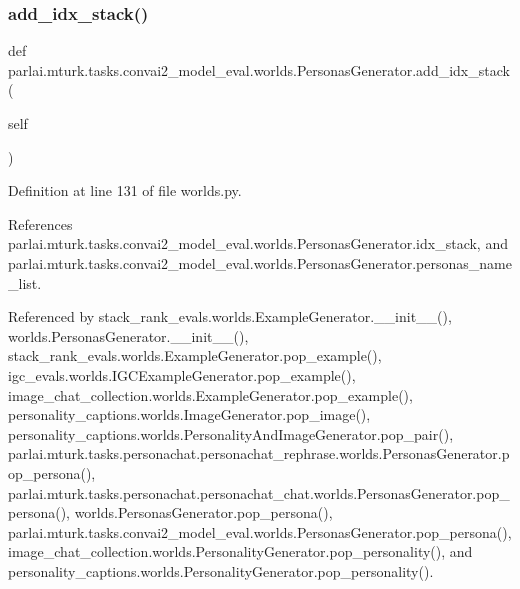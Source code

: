 \subsubsection{\texorpdfstring{add\+\_\+idx\+\_\+stack()}{add\_idx\_stack()}}
{\footnotesize\ttfamily def parlai.\+mturk.\+tasks.\+convai2\+\_\+model\+\_\+eval.\+worlds.\+Personas\+Generator.\+add\+\_\+idx\+\_\+stack (\begin{DoxyParamCaption}\item[{}]{self }\end{DoxyParamCaption})}



Definition at line 131 of file worlds.\+py.



References parlai.\+mturk.\+tasks.\+convai2\+\_\+model\+\_\+eval.\+worlds.\+Personas\+Generator.\+idx\+\_\+stack, and parlai.\+mturk.\+tasks.\+convai2\+\_\+model\+\_\+eval.\+worlds.\+Personas\+Generator.\+personas\+\_\+name\+\_\+list.



Referenced by stack\+\_\+rank\+\_\+evals.\+worlds.\+Example\+Generator.\+\_\+\+\_\+init\+\_\+\+\_\+(), worlds.\+Personas\+Generator.\+\_\+\+\_\+init\+\_\+\+\_\+(), stack\+\_\+rank\+\_\+evals.\+worlds.\+Example\+Generator.\+pop\+\_\+example(), igc\+\_\+evals.\+worlds.\+I\+G\+C\+Example\+Generator.\+pop\+\_\+example(), image\+\_\+chat\+\_\+collection.\+worlds.\+Example\+Generator.\+pop\+\_\+example(), personality\+\_\+captions.\+worlds.\+Image\+Generator.\+pop\+\_\+image(), personality\+\_\+captions.\+worlds.\+Personality\+And\+Image\+Generator.\+pop\+\_\+pair(), parlai.\+mturk.\+tasks.\+personachat.\+personachat\+\_\+rephrase.\+worlds.\+Personas\+Generator.\+pop\+\_\+persona(), parlai.\+mturk.\+tasks.\+personachat.\+personachat\+\_\+chat.\+worlds.\+Personas\+Generator.\+pop\+\_\+persona(), worlds.\+Personas\+Generator.\+pop\+\_\+persona(), parlai.\+mturk.\+tasks.\+convai2\+\_\+model\+\_\+eval.\+worlds.\+Personas\+Generator.\+pop\+\_\+persona(), image\+\_\+chat\+\_\+collection.\+worlds.\+Personality\+Generator.\+pop\+\_\+personality(), and personality\+\_\+captions.\+worlds.\+Personality\+Generator.\+pop\+\_\+personality().

